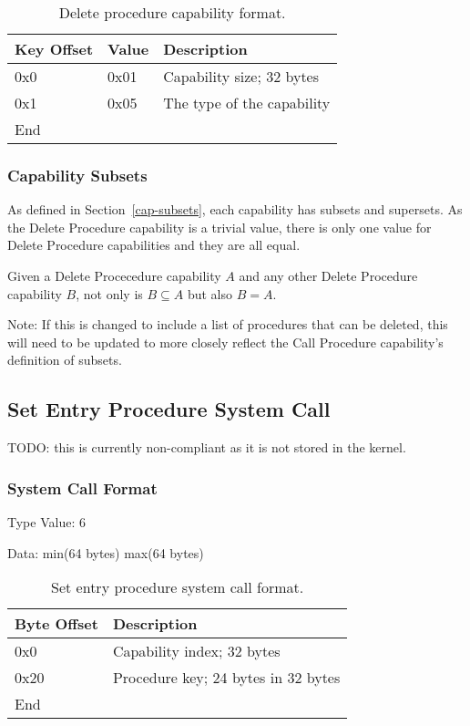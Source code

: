 \documentclass[english,a4paper]{article}
\let\oldparagraph\subsubsection
\renewcommand{\subsubsection}[1]{\oldparagraph{#1}\mbox{}}
\begin{document}
\begin{table}[H]
  \caption{Delete procedure capability format.}
  \centering{}%
  \begin{tabular}{l|l|p{}}
    \hline
    Key Offset & Value & Description\tabularnewline
    \hline
    \hline
    0x0 & 0x01 & Capability size; 32 bytes \tabularnewline
    0x1 & 0x05 & The type of the capability \tabularnewline
    \hline
    End &  \tabularnewline
    \hline
  \end{tabular}
\end{table}

\subsubsection{Capability Subsets}
As defined in Section~\ref{cap-subsets}, each capability has subsets and
supersets. As the Delete Procedure capability is a trivial value, there is only
one value for Delete Procedure capabilities and they are all equal.

Given a Delete Procecedure capability $A$ and any other Delete Procedure
capability $B$, not only is $B \subseteq A$ but also $B = A$.

Note: If this is changed to include a list of procedures that can be deleted,
this will need to be updated to more closely reflect the Call Procedure
capability's definition of subsets.

\subsection{Set Entry Procedure System Call}
TODO: this is currently non-compliant as it is not stored in the kernel.

\subsubsection{System Call Format}

Type Value: 6

Data: min(64 bytes) max(64 bytes)

\begin{table}[H]
  \caption{Set entry procedure system call format.}
  \centering{}%
  \begin{tabular}{l|p{}}
    \hline
    Byte Offset & Description\tabularnewline
    \hline
    \hline
    0x0 & Capability index; 32 bytes \tabularnewline
    0x20 & Procedure key; 24 bytes in 32 bytes \tabularnewline
    \hline
    End &  \tabularnewline
    \hline
  \end{tabular}
\end{table}
\end{document}
